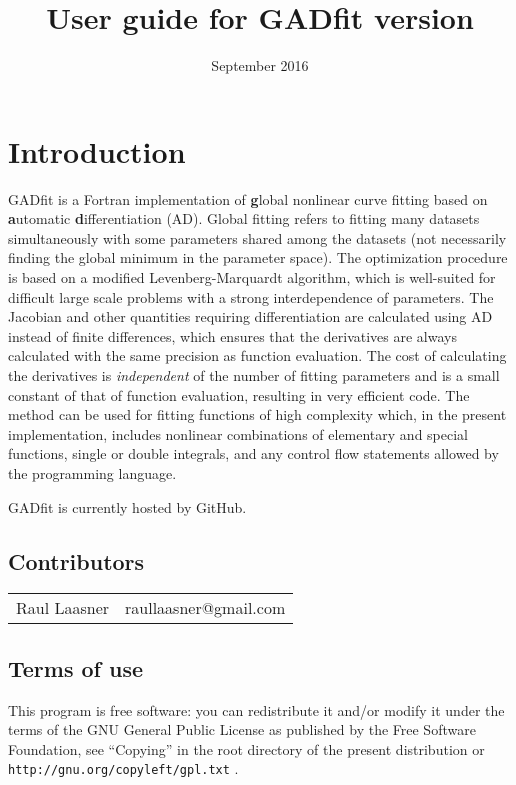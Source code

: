 \documentclass{article}
\title{User guide for GADfit version \version}
\date{September 2016}
\begin{document}
\maketitle
\tableofcontents

\section{Introduction}

GADfit is a Fortran implementation of \textbf{g}lobal nonlinear curve fitting based on \textbf{a}utomatic \textbf{d}ifferentiation (AD). Global fitting refers to fitting many datasets simultaneously with some parameters shared among the datasets (not necessarily finding the global minimum in the parameter space). The optimization procedure is based on a modified Levenberg-Marquardt algorithm, which is well-suited for difficult large scale problems with a strong interdependence of parameters. The Jacobian and other quantities requiring differentiation are calculated using AD instead of finite differences, which ensures that the derivatives are always calculated with the same precision as function evaluation. The cost of calculating the derivatives is \textit{independent} of the number of fitting parameters and is a small constant of that of function evaluation, resulting in very efficient code. The method can be used for fitting functions of high complexity which, in the present implementation, includes nonlinear combinations of elementary and special functions, single or double integrals, and any control flow statements allowed by the programming language.

GADfit is currently hosted by GitHub.

\subsection{Contributors}

\begin{tabular}{ll}
  Raul Laasner & raullaasner@gmail.com \\
\end{tabular}

\subsection{Terms of use}

This program is free software: you can redistribute it and/or modify it under the terms of the GNU General Public License as published by the Free Software Foundation, see ``Copying'' in the root directory of the present distribution or \texttt{http://gnu.org/copyleft/gpl.txt} .
\end{document}
